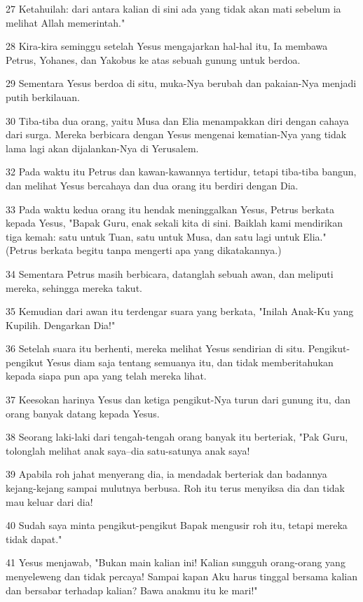 \par 27 Ketahuilah: dari antara kalian di sini ada yang tidak akan mati sebelum ia melihat Allah memerintah."
\par 28 Kira-kira seminggu setelah Yesus mengajarkan hal-hal itu, Ia membawa Petrus, Yohanes, dan Yakobus ke atas sebuah gunung untuk berdoa.
\par 29 Sementara Yesus berdoa di situ, muka-Nya berubah dan pakaian-Nya menjadi putih berkilauan.
\par 30 Tiba-tiba dua orang, yaitu Musa dan Elia menampakkan diri dengan cahaya dari surga. Mereka berbicara dengan Yesus mengenai kematian-Nya yang tidak lama lagi akan dijalankan-Nya di Yerusalem.
\par 32 Pada waktu itu Petrus dan kawan-kawannya tertidur, tetapi tiba-tiba bangun, dan melihat Yesus bercahaya dan dua orang itu berdiri dengan Dia.
\par 33 Pada waktu kedua orang itu hendak meninggalkan Yesus, Petrus berkata kepada Yesus, "Bapak Guru, enak sekali kita di sini. Baiklah kami mendirikan tiga kemah: satu untuk Tuan, satu untuk Musa, dan satu lagi untuk Elia." (Petrus berkata begitu tanpa mengerti apa yang dikatakannya.)
\par 34 Sementara Petrus masih berbicara, datanglah sebuah awan, dan meliputi mereka, sehingga mereka takut.
\par 35 Kemudian dari awan itu terdengar suara yang berkata, "Inilah Anak-Ku yang Kupilih. Dengarkan Dia!"
\par 36 Setelah suara itu berhenti, mereka melihat Yesus sendirian di situ. Pengikut-pengikut Yesus diam saja tentang semuanya itu, dan tidak memberitahukan kepada siapa pun apa yang telah mereka lihat.
\par 37 Keesokan harinya Yesus dan ketiga pengikut-Nya turun dari gunung itu, dan orang banyak datang kepada Yesus.
\par 38 Seorang laki-laki dari tengah-tengah orang banyak itu berteriak, "Pak Guru, tolonglah melihat anak saya--dia satu-satunya anak saya!
\par 39 Apabila roh jahat menyerang dia, ia mendadak berteriak dan badannya kejang-kejang sampai mulutnya berbusa. Roh itu terus menyiksa dia dan tidak mau keluar dari dia!
\par 40 Sudah saya minta pengikut-pengikut Bapak mengusir roh itu, tetapi mereka tidak dapat."
\par 41 Yesus menjawab, "Bukan main kalian ini! Kalian sungguh orang-orang yang menyeleweng dan tidak percaya! Sampai kapan Aku harus tinggal bersama kalian dan bersabar terhadap kalian? Bawa anakmu itu ke mari!"
